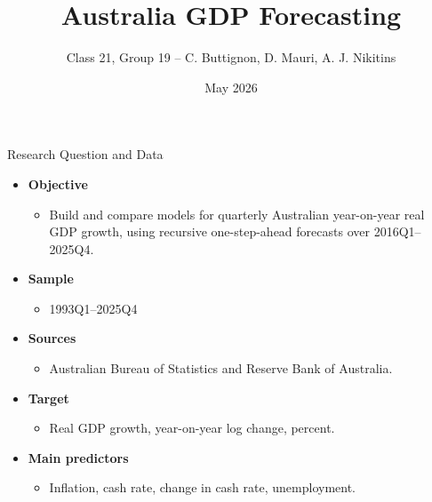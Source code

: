 \documentclass[aspectratio=169,10pt]{beamer}
\title{Australia GDP Forecasting}
\author[Class 21, Group 19]{Class 21, Group 19 -- C. Buttignon, D. Mauri, A. J. Nikitins}
\date{May 2026}
\begin{document}
\begin{frame}
  \titlepage
\end{frame}

\begin{frame}{Research Question and Data}
\begin{itemize}
    \item \textbf{Objective}
    \begin{itemize}
        \item Build and compare models for quarterly Australian year-on-year real GDP growth, using recursive one-step-ahead forecasts over 2016Q1--2025Q4.
    \end{itemize}
    \item \textbf{Sample}
    \begin{itemize}
        \item 1993Q1--2025Q4
    \end{itemize}
    \item \textbf{Sources}
    \begin{itemize}
        \item Australian Bureau of Statistics and Reserve Bank of Australia.
    \end{itemize}
    \item \textbf{Target}
    \begin{itemize}
        \item Real GDP growth, year-on-year log change, percent.
    \end{itemize}
    \item \textbf{Main predictors}
    \begin{itemize}
        \item Inflation, cash rate, change in cash rate, unemployment.
    \end{itemize}
\end{itemize}
\end{frame}
\end{document}

